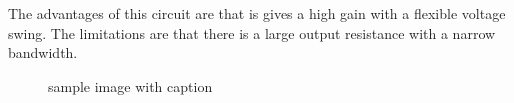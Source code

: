 \documentclass[12pt]{article}
\begin{document}
The advantages of this circuit are that is gives a high gain with a flexible voltage swing. The limitations are that there is a large output resistance with a narrow bandwidth.

\begin{figure}[H]
  \centering
    \qquad
    \qquad
    \caption{sample image with caption}%
    \label{fig:testing}%
\end{figure}
\end{document}
